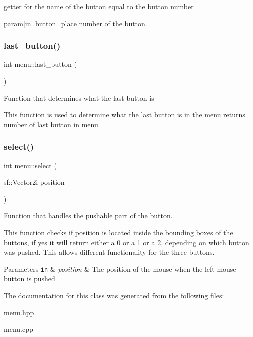 getter for the name of the button equal to the button number 

param\mbox{[}in\mbox{]} button\+\_\+place number of the button. \mbox{\label{classmenu_ab572ef3baf462b15322e37278d81494c}} 
\subsubsection{\texorpdfstring{last\+\_\+button()}{last\_button()}}
{\footnotesize\ttfamily int menu\+::last\+\_\+button (\begin{DoxyParamCaption}{ }\end{DoxyParamCaption})}

Function that determines what the last button is

This function is used to determine what the last button is in the menu returns number of last button in menu \mbox{\label{classmenu_a06744d58a2aad693d3637d0485aa7984}} 
\subsubsection{\texorpdfstring{select()}{select()}}
{\footnotesize\ttfamily int menu\+::select (\begin{DoxyParamCaption}\item[{sf\+::\+Vector2i}]{position }\end{DoxyParamCaption})}



Function that handles the pushable part of the button. 

This function checks if position is located inside the bounding boxes of the buttons, if yes it will return either a 0 or a 1 or a 2, depending on which button was pushed. This allows different functionality for the three buttons.


\begin{DoxyParams}[1]{Parameters}
\mbox{\tt in}  & {\em position} & The position of the mouse when the left mouse button is pushed \\
\hline
\end{DoxyParams}


The documentation for this class was generated from the following files\+:\begin{DoxyCompactItemize}
\item 
\hyperlink{menu_8hpp}{menu.\+hpp}\item 
menu.\+cpp\end{DoxyCompactItemize}
